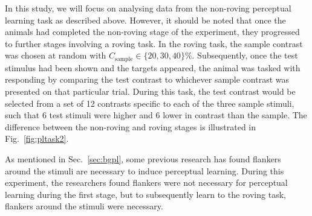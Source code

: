 In this study, we will focus on analysing data from the non-roving perceptual learning task as described above.
However, it should be noted that once the animals had completed the non-roving stage of the experiment, they progressed to further stages involving a roving task.
In the roving task, the sample contrast was chosen at random with $C_\text{sample} \in \{20, 30, 40\}\%$.
Subsequently, once the test stimulus had been shown and the targets appeared, the animal was tasked with responding by comparing the test contrast to whichever sample contrast was presented on that particular trial.
During this task, the test contrast would be selected from a set of 12 contrasts specific to each of the three sample stimuli, such that 6 test stimuli were higher and 6 lower in contrast than the sample.
The difference between the non-roving and roving stages is illustrated in Fig.~\ref{fig:pltask2}.
%

As mentioned in Sec.~\ref{sec:bgpl}, some previous research has found flankers around the stimuli are necessary to induce perceptual learning.
During this experiment, the researchers found flankers were not necessary for perceptual learning during the first stage, but to subsequently learn to the roving task, flankers around the stimuli were necessary.


